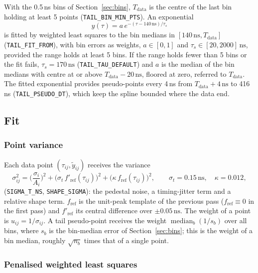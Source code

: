 \documentclass[11pt]{article}
\newcommand{\ns}{\,\mathrm{ns}}
\newcommand{\code}[1]{\texttt{#1}}
\DeclareMathOperator{\median}{median}
\begin{document}
With the 0.5\,ns bins of Section~\ref{sec:bins}, $T_{\mathrm{data}}$ is the centre of the last bin holding at least 5 points (\code{TAIL\_BIN\_MIN\_PTS}). An exponential
\begin{equation}
y(\tau) = a\, e^{-(\tau - 140\ns)/\tau_s}
\end{equation}
is fitted by weighted least squares to the bin medians in $[140\ns, T_{\mathrm{data}}]$ (\code{TAIL\_FIT\_FROM}), with bin errors as weights, $a \in [0, 1]$ and $\tau_s \in [20, 2000]\ns$, provided the range holds at least 5 bins. If the range holds fewer than 5 bins or the fit fails, $\tau_s = 170\ns$ (\code{TAIL\_TAU\_DEFAULT}) and $a$ is the median of the bin medians with centre at or above $T_{\mathrm{data}} - 20\ns$, floored at zero, referred to $T_{\mathrm{data}}$. The fitted exponential provides pseudo-points every 4\,ns from $T_{\mathrm{data}} + 4\ns$ to 416\,ns (\code{TAIL\_PSEUDO\_DT}), which keep the spline bounded where the data end.

\subsection{Fit}
\label{sec:fit}

\subsubsection{Point variance}

Each data point $(\tau_{ij}, \tilde y_{ij})$ receives the variance
\begin{equation}
\sigma^2_{ij} = \Big(\frac{\sigma_i}{A_i}\Big)^2 + \big(\sigma_t\, f'_{\mathrm{ref}}(\tau_{ij})\big)^2 + \big(\kappa\, f_{\mathrm{ref}}(\tau_{ij})\big)^2,
\qquad \sigma_t = 0.15\ns,\quad \kappa = 0.012,
\label{eq:var}
\end{equation}
(\code{SIGMA\_T\_NS}, \code{SHAPE\_SIGMA}): the pedestal noise, a timing-jitter term and a relative shape term. $f_{\mathrm{ref}}$ is the unit-peak template of the previous pass ($f_{\mathrm{ref}} \equiv 0$ in the first pass) and $f'_{\mathrm{ref}}$ its central difference over $\pm 0.05\ns$. The weight of a point is $u_{ij} = 1/\sigma_{ij}$. A tail pseudo-point receives the weight $\median_b (1/s_b)$ over all bins, where $s_b$ is the bin-median error of Section~\ref{sec:bins}; this is the weight of a bin median, roughly $\sqrt{n_b}$ times that of a single point.

\subsubsection{Penalised weighted least squares}
\label{sec:lsq}
\end{document}
